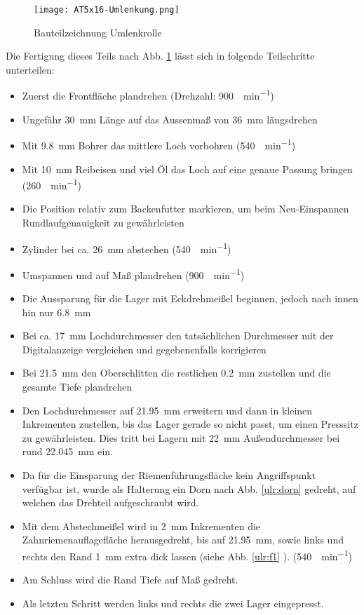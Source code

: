 \begin{figure}[H]
    \centering
    \texttt{[image: AT5x16-Umlenkung.png]}
    \caption{Bauteilzeichnung Umlenkrolle}
    \label{UmlenkrolleBTZ}
\end{figure}

Die Fertigung dieses Teils nach Abb. \ref{UmlenkrolleBTZ} lässt sich in folgende Teilschritte unterteilen:
\begin{itemize}
    \setlength\itemsep{-1mm} 
    \item Zuerst die Frontfläche plandrehen (Drehzahl: \SI{900}{\Umdrehung\per\minute})
    \item Ungefähr \SI{30}{mm} Länge auf das Aussenmaß von \SI{36}{mm} längsdrehen
    \item Mit \SI{9.8}{mm} Bohrer das mittlere Loch vorbohren (\SI{540}{\Umdrehung\per\minute})
    \item Mit \SI{10}{mm} Reibeisen und viel Öl das Loch auf eine genaue Passung bringen (\SI{260}{\Umdrehung\per\minute})
    \item Die Position relativ zum Backenfutter markieren, um beim Neu-Einspannen Rundlaufgenauigkeit zu gewährleisten
    \item Zylinder bei ca. \SI{26}{mm} abstechen (\SI{540}{\Umdrehung\per\minute})
    \item Umspannen und auf Maß plandrehen (\SI{900}{\Umdrehung\per\minute})
    \item Die Aussparung für die Lager mit Eckdrehmeißel beginnen, jedoch nach innen hin nur \SI{6.8}{mm}
    \item Bei ca. \SI{17}{mm} Lochdurchmesser den tatsächlichen Durchmesser mit der Digitalanzeige vergleichen und gegebenenfalls korrigieren
    \item Bei \SI{21.5}{mm} den Oberschlitten die restlichen \SI{0.2}{mm} zustellen und die gesamte Tiefe plandrehen
    \item Den Lochdurchmesser auf \SI{21.95}{mm} erweitern und dann in kleinen Inkrementen zustellen, bis das Lager gerade so nicht passt, um einen Presssitz zu gewährleisten. Dies tritt bei Lagern mit \SI{22}{mm} Außendurchmesser bei rund \SI{22.045}{mm} ein.
    \item Da für die Einsparung der Riemenführungsfläche kein Angriffspunkt verfügbar ist, wurde als Halterung ein Dorn nach Abb. \ref{ulr:dorn} gedreht, auf welchen das Drehteil aufgeschraubt wird.
    \item Mit dem Abstechmeißel wird in \SI{2}{mm} Inkrementen die Zahnriemenauflagefläche herausgedreht, bis auf \SI{21.95}{mm}, sowie links und rechts den Rand \SI{1}{mm} extra dick lassen (siehe Abb. \ref{ulr:f1} ). (\SI{540}{\Umdrehung\per\minute})
    \item Am Schluss wird die Rand Tiefe auf Maß gedreht.
    \item Als letzten Schritt werden links und rechts die zwei Lager eingepresst.
\end{itemize}


